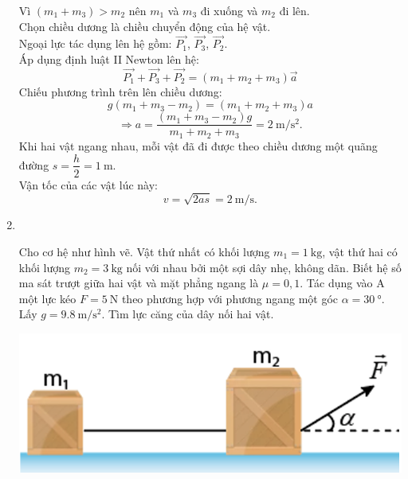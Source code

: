\begin{enumerate}[label=\bfseries Bài \arabic*:,leftmargin=1.5cm]
{\begin{center}
\end{center}
Vì $\left(m_1+m_3\right)>m_2$ nên $m_1$ và $m_3$ đi xuống và $m_2$ đi lên.\\
Chọn chiều dương là chiều chuyển động của hệ vật.\\
Ngoại lực tác dụng lên hệ gồm: $\overrightarrow{P_1}$, $\overrightarrow{P_3}$, $\overrightarrow{P_2}$.\\
Áp dụng định luật II Newton lên hệ:
$$\overrightarrow{P_1}+\overrightarrow{P_3}+\overrightarrow{P_2}=\left(m_1+m_2+m_3\right)\vec{a}$$
Chiếu phương trình trên lên chiều dương:
$$g\left(m_1+m_3-m_2\right)=\left(m_1+m_2+m_3\right)a$$
$$\Rightarrow a=\dfrac{\left(m_1+m_3-m_2\right)g}{m_1+m_2+m_3}=\SI{2}{\meter/\second^2}.$$
Khi hai vật ngang nhau, mỗi vật đã đi được theo chiều dương một quãng đường $s=\dfrac{h}{2}=\SI{1}{\meter}$.\\
Vận tốc của các vật lúc này: 
$$v=\sqrt{2as}=\SI{2}{\meter/\second}.$$
}

\item{}\\
{Cho cơ hệ như hình vẽ. Vật thứ nhất có khối lượng $m_1=\SI{1}{\kilogram}$, vật thứ hai có khối lượng $m_2=\SI{3}{\kilogram}$ nối với nhau bởi một sợi dây nhẹ, không dãn. Biết hệ số ma sát trượt giữa hai vật và mặt phẳng ngang là $\mu=0,1$. Tác dụng vào A một lực kéo $F=\SI{5}{\newton}$ theo phương hợp với phương ngang một góc $\alpha=\SI{30}{\degree}$. Lấy $g =\SI{9.8}{\meter/\second^2}$. Tìm lực căng của dây nối hai vật.
	\begin{center}
		\includegraphics[width=0.3\linewidth]{../figs/VN10-2022-PH-TP021-P-3}
	\end{center}  

}
\end{enumerate}

